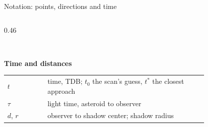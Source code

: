 \begin{frame}{Notation: points, directions and time}
\begin{columns}[T]
\begin{column}{0.46\textwidth}
\begin{tabular}{@{}l >{\raggedright\arraybackslash}p{0.80\linewidth}@{}}
      \end{tabular}\\[0.8ex]
      \textbf{Time and distances}\\[0.4ex]
      \begin{tabular}{@{}l >{\raggedright\arraybackslash}p{0.80\linewidth}@{}}
        $t$ & time, TDB; $t_0$ the scan's guess, $t^{*}$ the closest approach \\
        $\tau$ & light time, asteroid to observer \\
        $d$, $r$ & observer to shadow center; shadow radius \\
      \end{tabular}
    \end{column}
  \end{columns}
\end{frame}

